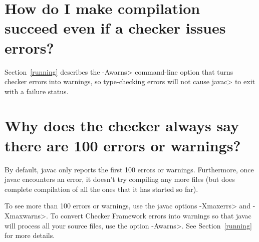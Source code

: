 % 
% 
% 
% 
% 
% 
% 


\section{How do I make compilation succeed even if a checker issues errors?\label{faq-awarns}}

Section~\ref{running} describes the \<-Awarns> command-line
option that turns checker errors into warnings, so type-checking errors
will not cause \<javac> to exit with a failure status.


\section{Why does the checker always say there are 100 errors or warnings?\label{faq-100-warnings}}

By default, javac only reports the first 100 errors or warnings.
Furthermore, once javac encounters an error, it doesn't try compiling any
more files (but does complete compilation of all the ones that it has
started so far).

To see more than 100 errors or warnings, use the javac options \<-Xmaxerrs>
and \<-Xmaxwarns>.  To convert Checker Framework errors into warnings so
that javac will process all your source files, use the option \<-Awarns>.
See Section~\ref{running} for more details.


